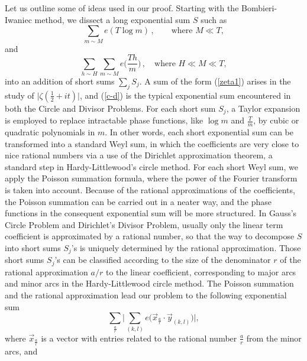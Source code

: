 \documentclass[11pt]{amsart}
\numberwithin{equation}{section}
\theoremstyle{definition}
\theoremstyle{proposition}
\begin{document}
Let us outline some of ideas used in our proof.  Starting with the Bombieri-Iwaniec method, we dissect a long exponential sum $S$
such as 
\begin{equation}\label{zeta1}%
\sum_{m\sim M} e(T\log m) \,,\quad \quad \text{where } M\ll T,    
\end{equation}
and 
\begin{equation} \label{c-d}%
\sum_{h\sim H}\sum_{m\sim M} e\Big(\frac{Th}{m} \Big) \,,\quad \text{where }  H\ll M\ll T,    
\end{equation}
into an addition of short sums $\sum_j S_j$. A sum of the form (\ref{zeta1}) arises in the study of 
$\Big|\zeta(\frac{1}{2}+it)\Big|$, and (\ref{c-d}) is the typical exponential sum encountered in both the Circle and Divisor Problems. 
For each short sum $S_j$, a Taylor expansion is employed to replace intractable phase functions, like $\log m$ and $\frac{T}{m}$, 
by cubic or quadratic polynomials in $m$. In other words, each short exponential sum can be transformed into a  standard Weyl sum, in which the coefficients are very close to
nice rational numbers via a use of the Dirichlet approximation theorem, a standard step in Hardy-Littlewood's circle method. 
For each short Weyl sum, we apply the Poisson summation formula, where the power of the Fourier transform is taken into account. Because of the rational approximations of the coefficients, the Poisson summation can be carried out in a neater way, and the phase functions in the consequent exponential sum will be more structured.  In Gauss's Circle Problem and Dirichlet's Divisor Problem, 
usually only the linear term coefficient is approximated by a rational number, so that the way to decompose $S$ into short sums $S_j$'s is uniquely determined by the rational approximation.  Those short sums $S_j$'s can be classified 
according to the size of the denominator $r$ of the rational approximation $a/r$ to the linear coefficient, corresponding to
major arcs and minor arcs in the Hardy-Littlewood circle method. The Poisson summation and the rational approximation lead our problem to the following exponential sum 
\begin{equation}\label{inner}
\sum_{\frac{a}{r}} \Big| \sum_{(k,l)} e\Big(\Vec{x}_{\frac{a}{r}}\cdot \Vec{y}_{(k,l)}\Big) \Big|,
\end{equation}
where $\Vec{x}_{\frac{a}{r}}$ is a vector with entries related to the rational number $\frac{a}{r}$ from the minor arcs, and
\end{document}
